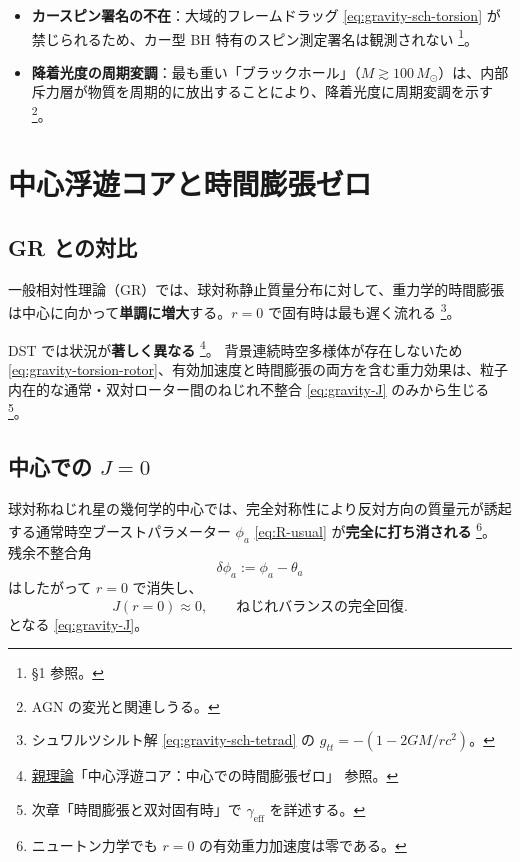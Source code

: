 \documentclass[dvipdfmx,a4paper,oneside]{jsbook}
\numberwithin{equation}{chapter}
\begin{document}
\begin{itemize}[leftmargin=2em]
  \item \textbf{カースピン署名の不在}：大域的フレームドラッグ \eqref{eq:gravity-sch-torsion} が禁じられるため、カー型 BH 特有のスピン測定署名は観測されない \footnote{§1 参照。}。
  \item \textbf{降着光度の周期変調}：最も重い「ブラックホール」（\(M \gtrsim 100\,M_\odot\)）は、内部斥力層が物質を周期的に放出することにより、降着光度に周期変調を示す \footnote{AGN の変光と関連しうる。}。
\end{itemize}

\section{中心浮遊コアと時間膨張ゼロ}

\subsection{GR との対比}

一般相対性理論（GR）では、球対称静止質量分布に対して、重力学的時間膨張は中心に向かって\textbf{単調に増大}する。\(r = 0\) で固有時は最も遅く流れる \footnote{シュワルツシルト解 \eqref{eq:gravity-sch-tetrad} の \(g_{tt} = -(1 - 2GM/rc^2)\)。}。

DST では状況が\textbf{著しく異なる} \footnote{\hyperref[sec:sister-manuscripts]{親理論}「中心浮遊コア：中心での時間膨張ゼロ」 参照。}。
背景連続時空多様体が存在しないため \eqref{eq:gravity-torsion-rotor}、有効加速度と時間膨張の両方を含む重力効果は、粒子内在的な通常・双対ローター間のねじれ不整合 \eqref{eq:gravity-J} のみから生じる \footnote{次章「時間膨張と双対固有時」で \(\gamma_{\mathrm{eff}}\) を詳述する。}。

\subsection{中心での \(J = 0\)}

球対称ねじれ星の幾何学的中心では、完全対称性により反対方向の質量元が誘起する通常時空ブーストパラメーター \(\phi_a\) \eqref{eq:R-usual} が\textbf{完全に打ち消される} \footnote{ニュートン力学でも \(r = 0\) の有効重力加速度は零である。}。
残余不整合角
\begin{equation}
  \delta\phi_a := \phi_a - \theta_a
  \label{eq:strongfield-delta-phi}
\end{equation}
はしたがって \(r = 0\) で消失し、
\begin{equation}
  \boxed{\;
  J(r = 0) \approx 0,
  \qquad
  \text{ねじれバランスの完全回復}.
  \;}
  \label{eq:strongfield-floating-core}
\end{equation}
となる \eqref{eq:gravity-J}。
\end{document}

